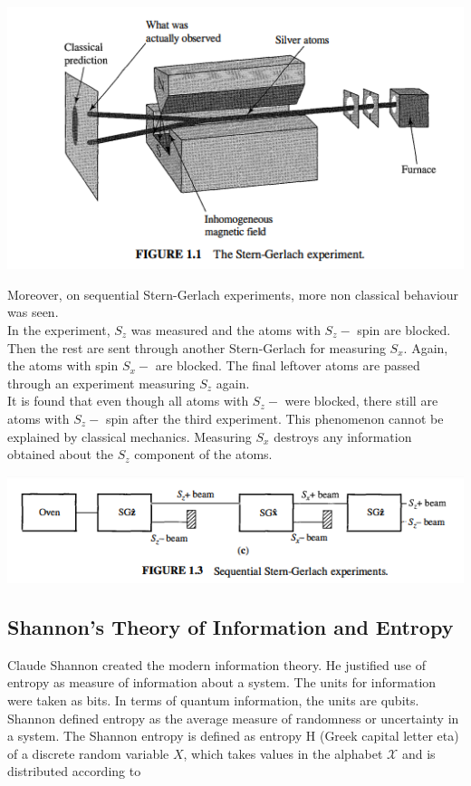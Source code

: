 \documentclass{article}
\begin{document}
\includegraphics[width = 12 cm]{sterngerlach.png}

Moreover, on sequential Stern-Gerlach experiments, more non classical behaviour was seen.\\

In the experiment, $S_z$ was measured and the atoms with $S_z-$ spin are blocked. Then the rest are
sent through another Stern-Gerlach for measuring $S_x$. Again, the atoms with spin $S_x-$ are blocked.
The final leftover atoms are passed through an experiment measuring $S_z$ again. \\

It is found that even though all atoms with $S_z-$ were blocked, there still are atoms with $S_z-$ spin
after the third experiment. This phenomenon cannot be explained by classical mechanics. Measuring $S_x$ destroys any information obtained about the $S_z$ component of the atoms.

\includegraphics[width = 12 cm]{seqSG.png}

\subsection{Shannon's Theory of Information and Entropy}
Claude Shannon created the modern information theory. He justified use of entropy as measure of information
about a system. The units for information were taken as bits. In terms of quantum information, the units are
qubits. \\

Shannon defined entropy as the average measure of randomness or uncertainty in a system. The Shannon entropy
is defined as entropy H (Greek capital letter eta) of a discrete random variable $X$, which takes values in the alphabet $\mathcal{X}$ and is distributed according to \\
\end{document}
